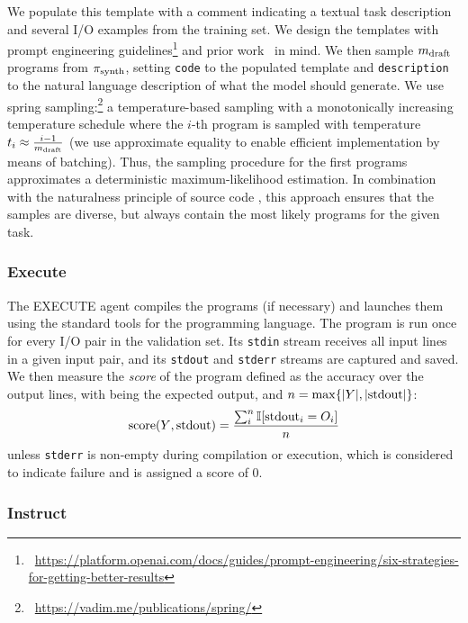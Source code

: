 We populate this template with a comment indicating a textual task description and several I/O examples from the training set.
We design the templates with prompt engineering guidelines\footnote{~\url{https://platform.openai.com/docs/guides/prompt-engineering/six-strategies-for-getting-better-results}} and prior work~\cite{debruin2021:autoencoders} in mind.
We then sample $m_\text{draft}$ programs from $ \pi_\text{synth} $, setting \texttt{code} to the populated template and \texttt{description} to the natural language description of what the model should generate.
We use spring sampling:\footnote{~\url{https://vadim.me/publications/spring/}} a temperature-based sampling with a monotonically increasing temperature schedule where the $i$-th program is sampled with temperature $t_i \approx \frac{i-1}{m_\text{draft}}$ (we use approximate equality to enable efficient implementation by means of batching).
Thus, the sampling procedure for the first programs approximates a deterministic maximum-likelihood estimation.
In combination with the naturalness principle of source code \cite{allamanis2018:survey,jiang2022:bugs}, this approach ensures that the samples are diverse, but always contain the most likely programs for the given task.

\subsubsection{Execute}
\label{sec:seidr-execute}


The EXECUTE agent compiles the programs (if necessary) and launches them using the standard tools for the programming language.
The program is run once for every I/O pair in the validation set. 
Its \texttt{stdin} stream receives all input lines in a given input pair, and its \texttt{stdout} and \texttt{stderr} streams are captured and saved.
We then measure the \emph{score} of the program defined as the accuracy over the output lines, with \expoutputvec{} being the expected output, and $n=\max\{|Y{}|, |\text{stdout}|\}$:
\[    
\text{score}(Y{}, \text{stdout}) = \frac{\sum^{n}_i{\mathbb{I}[\text{stdout}_i = O_i]}}{n} 
\]
unless \texttt{stderr} is non-empty during compilation or execution, which is considered to indicate failure and is assigned a score of 0.

\subsubsection{Instruct}
\label{sec:seidr-instruct}


